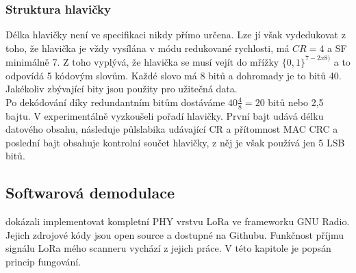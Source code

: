 \documentclass{ctuthesis}
\begin{document}
\subsubsection{Struktura hlavičky}
Délka hlavičky není ve specifikaci nikdy přímo určena. Lze jí však vydedukovat z toho, že hlavička je vždy vysílána v módu redukované rychlosti, má $CR =4$ a SF minimálně 7. Z toho vyplývá, že hlavička se musí vejít do mřížky $\{0,1\}^{7-2 x 8)}$ a to odpovídá 5 kódovým slovům. Každé slovo má 8 bitů a dohromady je to bitů 40. Jakékoliv zbývající bity jsou použity pro užitečná data. \\
Po dekódování díky redundantním bitům dostáváme $40\frac{4}{8} = 20$ bitů nebo 2,5 bajtu. V \cite{gr-lora2018} experimentálně vyzkoušeli pořadí hlavičky. První bajt udává délku datového obsahu, následuje půlslabika udávající CR a přítomnost MAC CRC a poslední bajt obsahuje kontrolní součet hlavičky, z něj je však používá jen 5 LSB bitů.

\subsection{Softwarová demodulace} \label{sec:softdem}
\cite{gr-lora2018} dokázali implementovat kompletní PHY vrstvu LoRa ve frameworku GNU Radio. Jejich zdrojové kódy jsou open source a dostupné na Githubu. Funkčnost příjmu signálu LoRa mého scanneru vychází z jejich práce. V této kapitole je popsán princip fungování.
\end{document}
